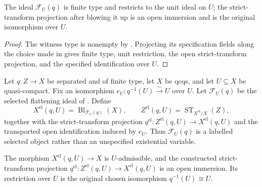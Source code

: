 \begin{lemma}
  \label{lemma:nagata-flattening-ideal}

  The ideal $\mathcal F_U(q)$ is finite type and restricts to the unit ideal
  on $U$; the strict-transform projection after blowing it up is an open
  immersion and is the original isomorphism over $U$.
\end{lemma}

\begin{proof}
  The witness type is nonempty by
  .  Projecting its specification
  fields along the choice made in
   gives finite type, unit restriction, the
  open strict-transform projection, and the specified identification over $U$.
\end{proof}

\begin{definition}
  \label{def:nagata-elimination-indeterminacy}

  Let $q\colon Z\to X$ be separated and of finite type, let $X$ be qcqs, and
  let $U\subseteq X$ be quasi-compact.  Fix an isomorphism
  $e_U\colon q^{-1}(U)\xrightarrow{\sim}U$ over $U$.
  Let $\mathcal F_U(q)$ be the selected flattening ideal of
  .  Define
  \[
    X^{\mathrm{el}}(q,U)=\operatorname{Bl}_{\mathcal F_U(q)}(X),
    \qquad
    Z^{\mathrm{el}}(q,U)=
      \operatorname{ST}_{X^{\mathrm{el}}/X}(Z),
  \]
  together with the strict-transform projection
  $q^{\mathrm{el}}\colon Z^{\mathrm{el}}(q,U)\to X^{\mathrm{el}}(q,U)$ and
  the transported open identification induced by $e_U$.
  Thus $\mathcal F_U(q)$ is a labelled selected object rather than an
  unspecified existential variable.
\end{definition}

\begin{lemma}
  \label{lemma:nagata-elimination-indeterminacy}

  The morphism $X^{\mathrm{el}}(q,U)\to X$ is $U$-admissible, and the
  constructed strict-transform projection
  $q^{\mathrm{el}}\colon Z^{\mathrm{el}}(q,U)\to X^{\mathrm{el}}(q,U)$ is
  an open immersion.  Its restriction over $U$ is the original chosen
  isomorphism $q^{-1}(U)\cong U$.
\end{lemma}

